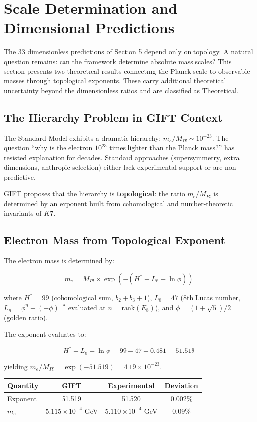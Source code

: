 \documentclass[11pt,a4paper]{article}
\newcommand{\E}{\mathrm{E}}
\newcommand{\Kseven}{K_7}
\newcommand{\Pl}{\mathrm{Pl}}
\newcommand{\rank}{\mathrm{rank}}
\newcommand{\theoretical}{\textsc{Theoretical}}
\def\Kseven{K7}%
\def\E{E}%
\def\Pl{Pl}%
\def\theoretical{Theoretical}%
\begin{document}
\section{Scale Determination and Dimensional Predictions}

The 33 dimensionless predictions of Section 5 depend only on topology. A natural question remains: can the framework determine absolute mass scales? This section presents two theoretical results connecting the Planck scale to observable masses through topological exponents. These carry additional theoretical uncertainty beyond the dimensionless ratios and are classified as \theoretical{}.

\subsection{The Hierarchy Problem in GIFT Context}

The Standard Model exhibits a dramatic hierarchy: $m_e/M_{\Pl} \sim 10^{-23}$. The question ``why is the electron $10^{23}$ times lighter than the Planck mass?'' has resisted explanation for decades. Standard approaches (supersymmetry, extra dimensions, anthropic selection) either lack experimental support or are non-predictive.

GIFT proposes that the hierarchy is \textbf{topological}: the ratio $m_e/M_{\Pl}$ is determined by an exponent built from cohomological and number-theoretic invariants of $\Kseven$.

\subsection{Electron Mass from Topological Exponent}

The electron mass is determined by:

\[\boxed{m_e = M_{\Pl} \times \exp\!\left(-(H^* - L_8 - \ln\phi)\right)}\]

where $H^* = 99$ (cohomological sum, $b_2 + b_3 + 1$), $L_8 = 47$ (8th Lucas number, $L_n = \phi^n + (-\phi)^{-n}$ evaluated at $n = \rank(\E_8)$), and $\phi = (1+\sqrt{5})/2$ (golden ratio).

The exponent evaluates to:

$$H^* - L_8 - \ln\phi = 99 - 47 - 0.481 = 51.519$$

yielding $m_e/M_{\Pl} = \exp(-51.519) = 4.19 \times 10^{-23}$.

\begin{table}[H]
\centering
\begin{tabular}{lccc}
\toprule
Quantity & GIFT & Experimental & Deviation \\
\midrule
Exponent & 51.519 & 51.520 & 0.002\% \\
$m_e$ & $5.115 \times 10^{-4}$ GeV & $5.110 \times 10^{-4}$ GeV & 0.09\% \\
\bottomrule
\end{tabular}
\end{table}
\end{document}
